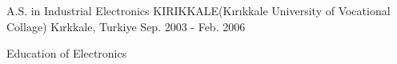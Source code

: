 

\begin{cventries}

  \cventry
    {A.S. in Industrial Electronics} %
    {KIRIKKALE(Kırıkkale University of Vocational Collage)} %
    {Kırkkale, Turkiye} %
    {Sep. 2003 - Feb. 2006} %
    {
      \begin{cvitems} %
        \item {Education of Electronics}
      \end{cvitems}
    }

\end{cventries}
